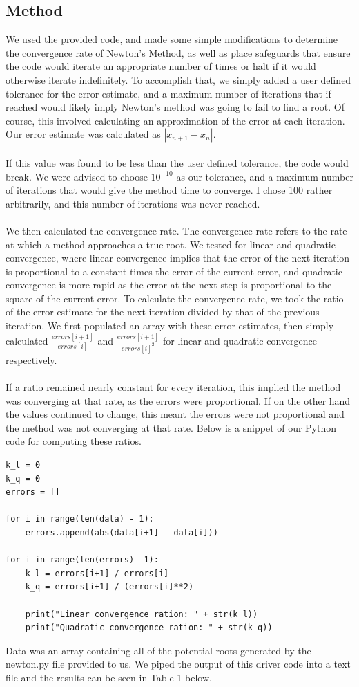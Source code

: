\documentclass[12pt]{article}
\begin{document}
\subsection{Method}
We used the provided code, and made some simple modifications to determine the convergence rate of Newton's Method, as well as place safeguards that ensure the code would iterate an appropriate number of times or halt if it would otherwise iterate indefinitely. To accomplish that, we simply added a user defined tolerance for the error estimate, and a maximum number of iterations that if reached would likely imply Newton's method was going to fail to find a root. Of course, this involved calculating an approximation of the error at each iteration. Our error estimate was calculated as $|x_{n+1} - x_n|$. \\ \\If this value  was found to be less than the user defined tolerance, the code would break. We were advised to choose $10^{-10}$ as our tolerance, and a maximum number of iterations that would give the method time to converge. I chose 100 rather arbitrarily, and this number of iterations was never reached. \\ \\We then calculated the convergence rate. The convergence rate refers to the rate at which a method approaches a true root. We tested for linear and quadratic convergence, where linear convergence implies that the error of the next iteration is proportional to a constant times the error of the current error, and quadratic convergence is more rapid as the error at the next step is proportional to the square of the current error.
To calculate the convergence rate, we took the ratio of the error estimate for the next iteration divided by that of the previous iteration. We first populated an array with these error estimates, then simply calculated $\frac{errors[i+1]}{errors[i]}$ and $\frac{errors[i+1]}{errors[i]^2}$ for linear and quadratic convergence respectively.\\ 
\\If a ratio remained nearly constant for every iteration, this implied the method was converging at that rate, as the errors were proportional. If on the other hand the values continued to change, this meant the errors were not proportional and the method was not converging at that rate. Below is a snippet of our Python code for computing these ratios. 
\begin{verbatim}
k_l = 0
k_q = 0
errors = []

for i in range(len(data) - 1):
    errors.append(abs(data[i+1] - data[i]))

for i in range(len(errors) -1):
    k_l = errors[i+1] / errors[i]
    k_q = errors[i+1] / (errors[i]**2)
        
    print("Linear convergence ration: " + str(k_l))
    print("Quadratic convergence ration: " + str(k_q))

\end{verbatim}
Data was an array containing all of the potential roots generated by the newton.py file provided to us. We piped the output of this driver code into a text file and the results can be seen in Table 1 below.
\end{document}
